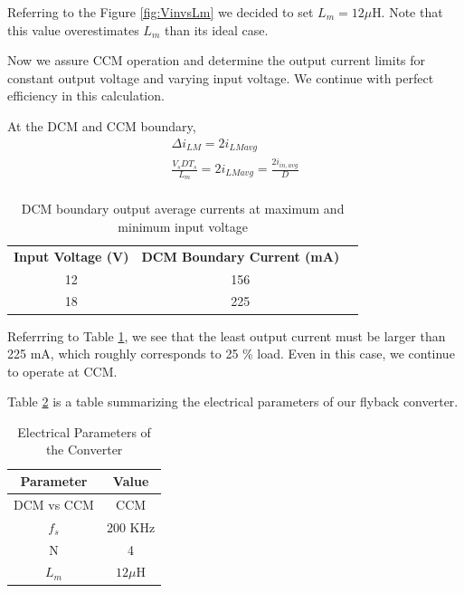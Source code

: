 \documentclass[12pt]{article}
\begin{document}
\begin{itemize}
        Referring to the Figure \ref{fig:VinvsLm} we decided to set $L_m = 12\mu$H. Note that this value overestimates $L_m$ than its ideal case. 
        
        Now we assure CCM operation and determine the output current limits for constant output voltage and varying input voltage. We continue with perfect efficiency in this calculation.

        At the DCM and CCM boundary, 
        \begin{align*}
            \Delta i_{LM} = 2 i_{LMavg}\\
            \frac{V_sDT_s}{L_m} = 2 i_{LMavg} =\frac{2i_{in,avg}}{D}\\
        \end{align*}

        \begin{table}[H]
        \centering
        \caption{DCM boundary output average currents at maximum and minimum input voltage}
        \begin{tabular}{|c|c|l}
        \cline{1-2}
        \textbf{Input Voltage (V)} & \textbf{DCM Boundary Current (mA)} &  \\ \cline{1-2}
        12                         & 156                                &  \\ \cline{1-2}
        18                         & 225                                &  \\ \cline{1-2}
        \end{tabular}
        \label{tab:DCM}
        \end{table}

        Referrring to Table \ref{tab:DCM}, we see that the least output current must be larger than 225 mA, which roughly corresponds to 25 \% load. Even in this case, we continue to operate at CCM.
    \end{itemize}

    Table \ref{tab:elec_sum} is a table summarizing the electrical parameters of our flyback converter.

    \begin{table}[H]
    \centering
    \caption{Electrical Parameters of the Converter}
    \begin{tabular}{|c|c|}
    \hline
    \textbf{Parameter} & \textbf{Value} \\ \hline
    DCM vs CCM         & CCM            \\ \hline
    $f_s$              & 200 KHz        \\ \hline
    N                  & 4              \\ \hline
    $L_m$              & $12\mu$H       \\ \hline
    \end{tabular}
    \label{tab:elec_sum}
    \end{table}
    
\end{document}

